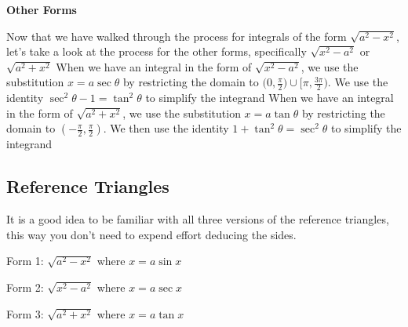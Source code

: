 \documentclass{report}
\begin{document}
   \bigbreak \noindent 
   \begin{large}
       \textbf{Other Forms}
   \end{large}
   \bigbreak \noindent 
   Now that we have walked through the process for integrals of the form $\sqrt{a^{2} - x^{2}}$, let's take a look at the process for the other forms, specifically $\sqrt{x^{2} - a^{2}}$ or $\sqrt{a^{2} + x^{2}}$
   \bigbreak \noindent 
   When we have an integral in the form of $\sqrt{x^{2} - a^{2}}$, we use the substitution $x=a\sec{\theta }$ by restricting the domain to $\bigg(0,\frac{\pi}{2}\bigg)\cup \bigg[\pi, \frac{3\pi}{2}\bigg) $. We use the identity  $\sec^{2}{\theta } - 1 = \tan^{2}{\theta } $ to simplify the integrand
   \bigbreak \noindent 
   When we have  an integral in the form of $\sqrt{a^{2} + x^{2}}$, we use the substitution $x=a\tan{\theta }$ by restricting the domain to $\left(-\frac{\pi}{2}, \frac{\pi}{2}\right) $. We then use the identity $1+\tan^{2}{\theta } = \sec^{2}{\theta }$ to simplify the integrand
   
   \bigbreak \noindent 

   \pagebreak 
   \subsection*{Reference Triangles}
   \bigbreak \noindent 
   It is a good idea to be familiar with all three versions of the reference triangles, this way you don't need to expend effort deducing the sides.
   \bigbreak \noindent 
   \begin{minipage}[]{0.47\textwidth}
       Form 1: $\sqrt{a^{2} - x^{2}}$ where $x=a\sin{x}$
       \bigbreak \noindent 
   \end{minipage}
   \begin{minipage}[]{0.47\textwidth}
        Form 2: $\sqrt{x^{2} - a^{2}}$ where $x=a\sec{x}$
        \bigbreak \noindent 
   \end{minipage}
   \bigbreak \noindent 
   Form 3: $\sqrt{a^{2} + x^{2}}$ where $x=a\tan{x}$
   \bigbreak \noindent 
\begin{figure}[ht]
    \centering
    \label{fig:tri4}
\end{figure}

    \pagebreak \bigbreak \noindent 
\end{document}
